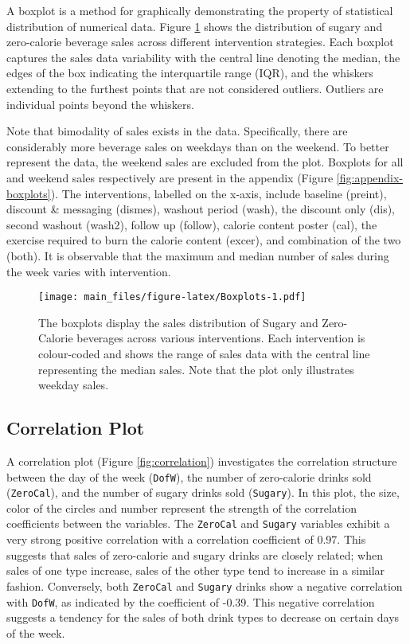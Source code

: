 \documentclass[
]{article}
\begin{document}
A boxplot is a method for graphically demonstrating the property of statistical distribution of numerical data. Figure \ref{fig:Boxplots} shows the distribution of sugary and zero-calorie beverage sales across different intervention strategies. Each boxplot captures the sales data variability with the central line denoting the median, the edges of the box indicating the interquartile range (IQR), and the whiskers extending to the furthest points that are not considered outliers. Outliers are individual points beyond the whiskers.

Note that bimodality of sales exists in the data. Specifically, there are considerably more beverage sales on weekdays than on the weekend. To better represent the data, the weekend sales are excluded from the plot. Boxplots for all and weekend sales respectively are present in the appendix (Figure \ref{fig:appendix-boxplots}). The interventions, labelled on the x-axis, include baseline (preint), discount \& messaging (dismes), washout period (wash), the discount only (dis), second washout (wash2), follow up (follow), calorie content poster (cal), the exercise required to burn the calorie content (excer), and combination of the two (both). It is observable that the maximum and median number of sales during the week varies with intervention.

\begin{figure}
\centering
\texttt{[image: main\_files/figure-latex/Boxplots-1.pdf]}
\caption{\label{fig:Boxplots}The boxplots display the sales distribution of Sugary and Zero-Calorie beverages across various interventions. Each intervention is colour-coded and shows the range of sales data with the central line representing the median sales. Note that the plot only illustrates weekday sales.}
\end{figure}

\hypertarget{correlation-plot}{%
\subsection{Correlation Plot}\label{correlation-plot}}

A correlation plot (Figure \ref{fig:correlation}) investigates the correlation structure between the day of the week (\texttt{DofW}), the number of zero-calorie drinks sold (\texttt{ZeroCal}), and the number of sugary drinks sold (\texttt{Sugary}). In this plot, the size, color of the circles and number represent the strength of the correlation coefficients between the variables. The \texttt{ZeroCal} and \texttt{Sugary} variables exhibit a very strong positive correlation with a correlation coefficient of 0.97. This suggests that sales of zero-calorie and sugary drinks are closely related; when sales of one type increase, sales of the other type tend to increase in a similar fashion. Conversely, both \texttt{ZeroCal} and \texttt{Sugary} drinks show a negative correlation with \texttt{DofW}, as indicated by the coefficient of -0.39. This negative correlation suggests a tendency for the sales of both drink types to decrease on certain days of the week.
\end{document}
